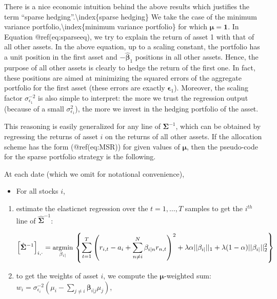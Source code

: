 There is a nice economic intuition behind the above results which justifies the term ``sparse hedging''.{\textbackslash}index\{sparse hedging\} We take the case of the minimum variance portfolio,{\textbackslash}index\{minimum variance portfolio\} for which $\boldsymbol{\mu}=\boldsymbol{1}$. In Equation @ref(eq:sparseeq), we try to explain the return of asset 1 with that of all other assets. In the above equation, up to a scaling constant, the portfolio has a unit position in the first asset and $-\hat{\boldsymbol{\beta}}_1$ positions in all other assets. Hence, the purpose of all other assets is clearly to hedge the return of the first one. In fact, these positions are aimed at minimizing the squared errors of the aggregate portfolio for the first asset (these errors are exactly $\mathbf{\epsilon}_1$). Moreover, the scaling factor $\sigma^{ -2}_{\epsilon_1}$ is also simple to interpret: the more we trust the regression output (because of a small $\sigma^{2}_{\epsilon_1}$), the more we invest in the hedging portfolio of the asset.

This reasoning is easily generalized for any line of $\mathbf{\Sigma}^{ -1}$, which can be obtained by regressing the returns of asset $i$ on the returns of all other assets. If the allocation scheme has the form (@ref(eq:MSR)) for given values of $\boldsymbol{\mu}$, then the pseudo-code for the sparse portfolio strategy is the following.

At each date (which we omit for notational convenience),

\begin{itemize}
\item For all stocks $i$,
\end{itemize}

\begin{enumerate}
\item estimate the elasticnet regression over the $t=1,\dots,T$ samples to get the $i^{th}$ line of $\hat{\mathbf{\Sigma}}^{ -1}$:

\begin{equation}
\small \left[\hat{\mathbf{\Sigma}}^{-1}\right]_{i,\cdot}= \underset{\mathbf{\beta}_{i|}}{\text{argmin}}\, \left\{\sum_{t=1}^T\left( r_{i,t}-a_i+\sum_{n\neq i}^N\beta_{i|n}r_{n,t}\right)^2+\lambda \alpha ||  \mathbf{\beta}_{i|}||_1+\lambda (1-\alpha)||\mathbf{\beta}_{i|}||_2^2\right\}
\end{equation}


\item to get the weights of asset $i$, we compute the $\mathbf{\mu}$-weighted sum:
$w_i= \sigma_{\epsilon_i}^{ -2}\left(\mu_i - \sum_{j\neq i}\mathbf{\beta}_{i|j}\mu_j\right)$,
\end{enumerate}

